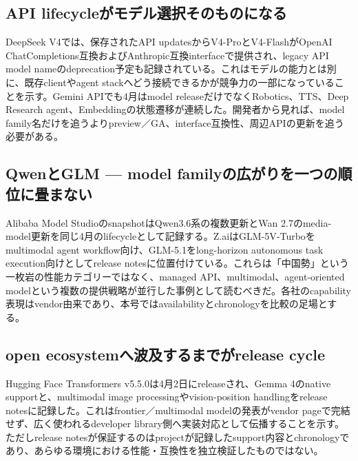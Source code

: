 \begingroup\raggedright
\subsection{API lifecycleがモデル選択そのものになる}
\par\endgroup

DeepSeek V4では、保存されたAPI updatesからV4-ProとV4-FlashがOpenAI ChatCompletions互換およびAnthropic互換interfaceで提供され、legacy API model nameのdeprecation予定も記録されている。これはモデルの能力とは別に、既存clientやagent stackへどう接続できるかが競争力の一部になっていることを示す。Gemini APIでも4月はmodel releaseだけでなくRobotics、TTS、Deep Research agent、Embeddingの状態遷移が連続した。開発者から見れば、model family名だけを追うよりpreview／GA、interface互換性、周辺APIの更新を追う必要がある。\autocite{src-a24fd97eb3d0,src-e547d0d8cbe3}


\begingroup\raggedright
\subsection{QwenとGLM — model familyの広がりを一つの順位に畳まない}
\par\endgroup

Alibaba Model StudioのsnapshotはQwen3.6系の複数更新とWan 2.7のmedia-model更新を同じ4月のlifecycleとして記録する。Z.aiはGLM-5V-Turboをmultimodal agent workflow向け、GLM-5.1をlong-horizon autonomous task execution向けとしてrelease notesに位置付けている。これらは「中国勢」という一枚岩の性能カテゴリーではなく、managed API、multimodal、agent-oriented modelという複数の提供戦略が並行した事例として読むべきだ。各社のcapability表現はvendor由来であり、本号ではavailabilityとchronologyを比較の足場とする。\autocite{src-9156c37fb1c2,src-eac8dfbeb78c}


\begingroup\raggedright
\subsection{open ecosystemへ波及するまでがrelease cycle}
\par\endgroup

Hugging Face Transformers v5.5.0は4月2日にreleaseされ、Gemma 4のnative supportと、multimodal image processingやvision-position handlingをrelease notesに記録した。これはfrontier／multimodal modelの発表がvendor pageで完結せず、広く使われるdeveloper library側へ実装対応として伝播することを示す。ただしrelease notesが保証するのはprojectが記録したsupport内容とchronologyであり、あらゆる環境における性能・互換性を独立検証したものではない。\autocite{src-6ddeedd7665f}


